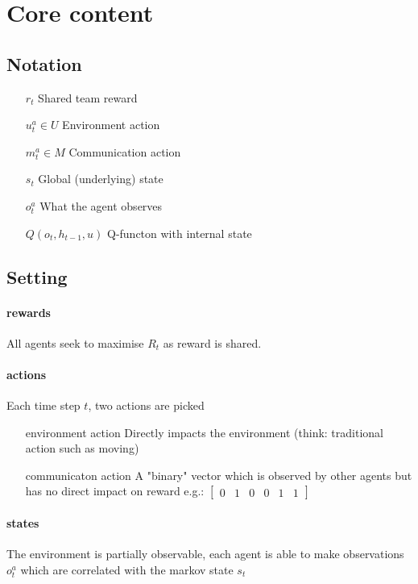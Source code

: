 \documentclass{article}
\begin{document}
    \section{Core content}

    \subsection{Notation}
    \begin{enumerate}
        \item[$r_t$] Shared team reward
        \item[$u^a_t \in U$] Environment action
        \item[$m^a_t \in M$] Communication action
        \item[$s_t$] Global (underlying) state
        \item[$o^a_t$] What the agent observes
        \item[$Q(o_t, h_{t-1}, u)$] Q-functon with internal state
    \end{enumerate}

    \subsection{Setting}
    \paragraph{rewards}All agents seek to maximise $R_t$ as reward is shared.
    \paragraph{actions} Each time step $t$, two actions are picked
    \begin{enumerate}
        \item[environment action] Directly impacts the environment (think: traditional action such as moving)
        \item[communicaton action] A "binary" vector which is observed by other agents but has no direct impact on reward e.g.: $\begin{bmatrix}0 & 1 & 0 & 0 & 1 & 1\end{bmatrix}$
    \end{enumerate}
    \paragraph{states} The environment is partially observable, each agent is able to make observations $o_t^a$ which are correlated with the markov state $s_t$
\end{document}
